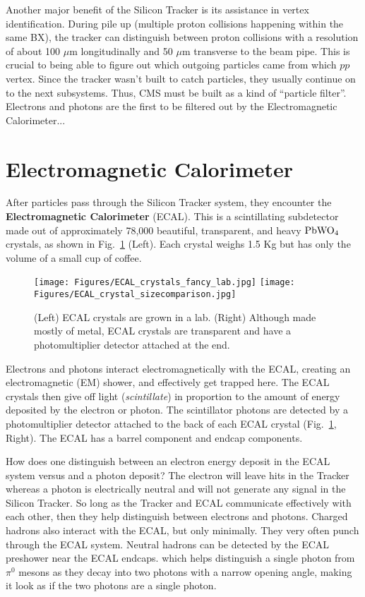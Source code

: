 Another major benefit of the Silicon Tracker is its assistance in vertex identification.
During pile up (multiple proton collisions happening within the same BX),
the tracker can distinguish between proton collisions with a resolution of about 
100 $\mu$m longitudinally and 50 $\mu$m transverse to the beam pipe.
This is crucial to being able to figure out which outgoing particles came from which $pp$ vertex.
Since the tracker wasn't built to catch particles, they usually continue on to the next subsystems.
Thus, CMS must be built as a kind of ``particle filter''.
Electrons and photons are the first to be filtered out by the Electromagnetic Calorimeter...

\section{Electromagnetic Calorimeter}
After particles pass through the Silicon Tracker system, they encounter the {\bf Electromagnetic Calorimeter} (ECAL). 
This is a scintillating subdetector made out of approximately 78,000 beautiful, transparent, and heavy ${\rm PbWO_{4}}$ crystals, as shown in Fig.~\ref{fig:ecal_crystals} (Left).
Each crystal weighs 1.5 Kg but has only the volume of a small cup of coffee. 

\begin{figure}[pbth]
\centering
\texttt{[image: Figures/ECAL\_crystals\_fancy\_lab.jpg]}
\texttt{[image: Figures/ECAL\_crystal\_sizecomparison.jpg]}
    \caption{
    (Left) ECAL crystals are grown in a lab.
    (Right) Although made mostly of metal, ECAL crystals are transparent and have a photomultiplier detector attached at the end.} 
    \label{fig:ecal_crystals}
\end{figure}
Electrons and photons interact electromagnetically with the ECAL, creating an electromagnetic (EM) shower, and effectively get trapped here.
The ECAL crystals then give off light (\emph{scintillate}) in proportion to the amount of energy deposited by the electron or photon. 
The scintillator photons are detected by a photomultiplier detector attached to the back of each ECAL crystal (Fig.~\ref{fig:ecal_crystals}, Right).
The ECAL has a barrel component and endcap components.

How does one distinguish between an electron energy deposit in the ECAL system versus and a photon deposit?
The electron will leave hits in the Tracker whereas a photon is electrically neutral and will not generate any signal in the Silicon Tracker. 
So long as the Tracker and ECAL communicate effectively with each other, then they help distinguish between electrons and photons.
Charged hadrons also interact with the ECAL, but only minimally. They very often punch through the ECAL system.
Neutral hadrons can be detected by the ECAL preshower near the ECAL endcaps. 
which helps distinguish a single photon from $\pi^{0}$ mesons as they decay into two photons with a narrow opening angle, making it look as if the two photons are a single photon.

